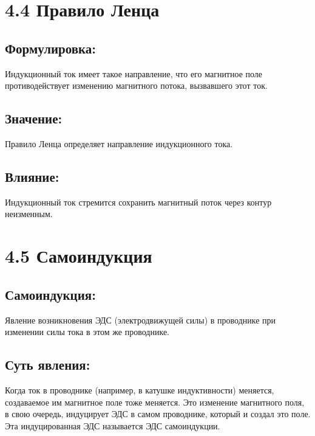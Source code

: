 \documentclass[a4paper,12pt]{article}
\begin{document}
\section*{4.4 Правило Ленца}
\vspace{-9pt}
\subsection*{Формулировка:}
\vspace{-3pt}
Индукционный ток имеет такое направление, что его магнитное поле противодействует изменению магнитного потока, вызвавшего этот ток.

\vspace{-9pt}
\subsection*{Значение:}
\vspace{-3pt}
Правило Ленца определяет направление индукционного тока.

\vspace{-9pt}
\subsection*{Влияние:}
\vspace{-3pt}
Индукционный ток стремится сохранить магнитный поток через контур неизменным.

\section*{4.5 Самоиндукция}
\vspace{-9pt}
\subsection*{Самоиндукция:}
\vspace{-3pt}
Явление возникновения ЭДС (электродвижущей силы) в проводнике при изменении силы тока в этом же проводнике.

\vspace{-9pt}
\subsection*{Суть явления:}
\vspace{-3pt}
Когда ток в проводнике (например, в катушке индуктивности) меняется, создаваемое им магнитное поле тоже меняется. Это изменение магнитного поля, в свою очередь, индуцирует ЭДС в самом проводнике, который и создал это поле. Эта индуцированная ЭДС называется ЭДС самоиндукции.
\end{document}
